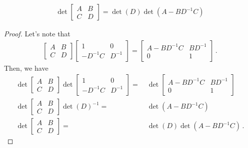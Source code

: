 \begin{proposition}
    \label{prop:block_det}
    \begin{align}
        \det
        \begin{bmatrix}
            A & B\\
            C & D
        \end{bmatrix}
        = \det(D)\det(A-BD^{-1}C)
    \end{align}
\end{proposition}
\begin{proof}
Let's note that
    \begin{align}
    \begin{bmatrix}
        A & B\\
        C & D
    \end{bmatrix}
    \begin{bmatrix}
        1 & 0\\
        -D^{-1}C & D^{-1}
    \end{bmatrix}
    = 
    \begin{bmatrix}
        A-BD^{-1}C & BD^{-1}\\
        0 & 1
    \end{bmatrix}\,.
    \end{align}
Then, we have
    \begin{align}
    \det
    \begin{bmatrix}
        A & B\\
        C & D
    \end{bmatrix}
    \det
    \begin{bmatrix}
        1 & 0\\
        -D^{-1}C & D^{-1}
    \end{bmatrix}
    =~& 
    \det
    \begin{bmatrix}
        A-BD^{-1}C & BD^{-1}\\
        0 & 1
    \end{bmatrix}\\
    \det
    \begin{bmatrix}
        A & B\\
        C & D
    \end{bmatrix}
    \det(D)^{-1}
    =~& 
    \det(A-BD^{-1}C)\\
    \det
    \begin{bmatrix}
        A & B\\
        C & D
    \end{bmatrix}
    =~& 
    \det(D)\det(A-BD^{-1}C)\,.
    \end{align}
\end{proof}


